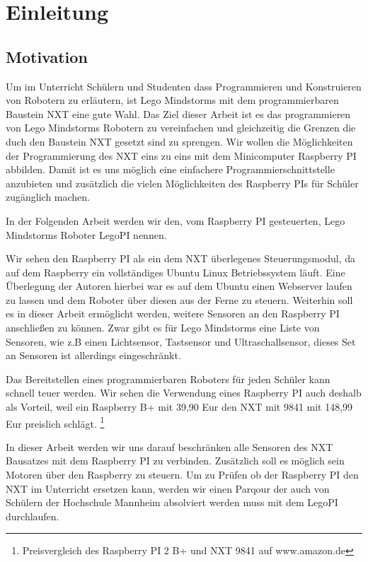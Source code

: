 \chapter{Einleitung}

\section{Motivation}
Um im Unterricht Schülern und Studenten dass Programmieren und Konstruieren von Robotern zu erläutern, ist Lego Mindstorms mit dem programmierbaren Baustein NXT eine gute Wahl. Das Ziel dieser Arbeit ist es das programmieren von Lego Mindstorms Robotern zu vereinfachen und gleichzeitig die Grenzen die duch den Baustein NXT gesetzt sind zu sprengen. Wir wollen die Möglichkeiten der Programmierung des NXT eins zu eins mit dem Minicomputer Raspberry PI abbilden. Damit ist es uns möglich eine einfachere Programmierschnittstelle anzubieten und zusätzlich die vielen Möglichkeiten des Raspberry PIs für Schüler zugänglich machen. 

In der Folgenden Arbeit werden wir den, vom Raspberry PI gesteuerten, Lego Mindstorms Roboter LegoPI nennen.

Wir sehen den Raspberry PI als ein dem NXT überlegenes Steuerungsmodul, da auf dem Raspberry ein vollständiges Ubuntu Linux Betriebssystem läuft. Eine Überlegung der Autoren hierbei war es auf dem Ubuntu einen Webserver laufen zu lassen und dem Roboter über diesen aus der Ferne zu steuern.
Weiterhin soll es in dieser Arbeit ermöglicht werden, weitere Sensoren an den Raspberry PI anschließen zu können. Zwar gibt es für Lego Mindstorms eine Liste von Sensoren, wie z.B einen Lichtsensor, Tastsensor und Ultraschallsensor, dieses Set an Sensoren ist allerdings eingeschränkt.

Das Bereitstellen eines programmierbaren Roboters für jeden Schüler kann schnell teuer werden. Wir sehen die Verwendung eines Raspberry PI auch deshalb als Vorteil, weil ein Raspberry B+ mit 39,90 Eur den NXT mit 9841 mit 148,99 Eur preislich schlägt. \footnote{Preisvergleich des Raspberry PI 2 B+ und NXT 9841 auf www.amazon.de}

In dieser Arbeit werden wir uns darauf beschränken alle Sensoren des NXT Bausatzes mit dem Raspberry PI zu verbinden. Zusätzlich soll es möglich sein Motoren über den Raspberry zu steuern. Um zu Prüfen ob der Raspberry PI den NXT im Unterricht ersetzen kann, werden wir einen Parqour der auch von Schülern der Hochschule Mannheim absolviert werden muss mit dem LegoPI durchlaufen.

